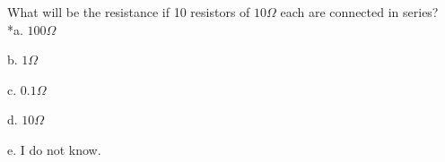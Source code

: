 
What will be the resistance if 10 resistors of \( 10 \Omega \) each are connected in series?\\

*a. \( 100 \Omega \)

b. \( 1 \Omega \) 

c. \( 0.1 \Omega \)

d. \( 10 \Omega \) 

e. I do not know.\\
